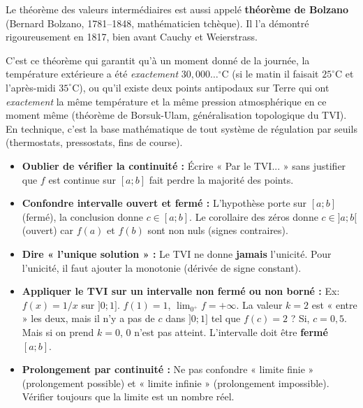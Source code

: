 \documentclass[11pt]{article}
\begin{document}
\begin{savaistu}
Le théorème des valeurs intermédiaires est aussi appelé \textbf{théorème de Bolzano} (Bernard Bolzano, 1781–1848, mathématicien tchèque). Il l'a démontré rigoureusement en 1817, bien avant Cauchy et Weierstrass.
\par
C'est ce théorème qui garantit qu'à un moment donné de la journée, la température extérieure a été \emph{exactement} $30,000\dots^\circ$C (si le matin il faisait $25^\circ$C et l'après-midi $35^\circ$C), ou qu'il existe deux points antipodaux sur Terre qui ont \emph{exactement} la même température et la même pression atmosphérique en ce moment même (théorème de Borsuk-Ulam, généralisation topologique du TVI). En technique, c'est la base mathématique de tout système de régulation par seuils (thermostats, pressostats, fins de course).
\end{savaistu}

\begin{attention}
\begin{itemize}
    \item \textbf{Oublier de vérifier la continuité :} Écrire « Par le TVI... » sans justifier que $f$ est continue sur $[a;b]$ fait perdre la majorité des points.
    \item \textbf{Confondre intervalle ouvert et fermé :} L'hypothèse porte sur $[a;b]$ (fermé), la conclusion donne $c \in [a;b]$. Le corollaire des zéros donne $c \in ]a;b[$ (ouvert) car $f(a)$ et $f(b)$ sont non nuls (signes contraires).
    \item \textbf{Dire « l'unique solution » :} Le TVI ne donne \textbf{jamais} l'unicité. Pour l'unicité, il faut ajouter la monotonie (dérivée de signe constant).
    \item \textbf{Appliquer le TVI sur un intervalle non fermé ou non borné :} Ex: $f(x)=1/x$ sur $]0;1]$. $f(1)=1$, $\lim_{0^+}f=+\infty$. La valeur $k=2$ est « entre » les deux, mais il n'y a pas de $c$ dans $]0;1]$ tel que $f(c)=2$ ? Si, $c=0,5$. Mais si on prend $k=0$, $0$ n'est pas atteint. L'intervalle doit être \textbf{fermé} $[a;b]$.
    \item \textbf{Prolongement par continuité :} Ne pas confondre « limite finie » (prolongement possible) et « limite infinie » (prolongement impossible). Vérifier toujours que la limite est un nombre réel.
\end{itemize}
\end{attention}
\end{document}
